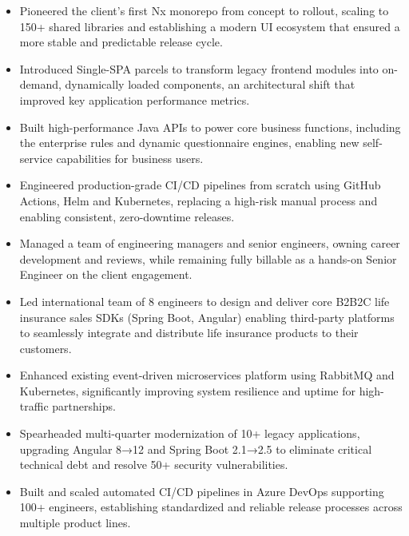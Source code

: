 \begin{itemize}
    \item Pioneered the client's first Nx monorepo from concept to rollout, scaling to 150+ shared libraries and establishing a modern UI ecosystem that ensured a more stable and predictable release cycle.
    \item Introduced Single-SPA parcels to transform legacy frontend modules into on-demand, dynamically loaded components, an architectural shift that improved key application performance metrics.
    \item Built high-performance Java APIs to power core business functions, including the enterprise rules and dynamic questionnaire engines, enabling new self-service capabilities for business users.
    \item Engineered production-grade CI/CD pipelines from scratch using GitHub Actions, Helm and Kubernetes, replacing a high-risk manual process and enabling consistent, zero-downtime releases.
    \item Managed a team of engineering managers and senior engineers, owning career development and reviews, while remaining fully billable as a hands-on Senior Engineer on the client engagement.
\end{itemize}
\vspace{\spacingBetweenJobs}

\begin{itemize}
    \item Led international team of 8 engineers to design and deliver core B2B2C life insurance sales SDKs (Spring Boot, Angular) enabling third-party platforms to seamlessly integrate and distribute life insurance products to their customers.
    \item Enhanced existing event-driven microservices platform using RabbitMQ and Kubernetes, significantly improving system resilience and uptime for high-traffic partnerships.
    \item Spearheaded multi-quarter modernization of 10+ legacy applications, upgrading Angular 8→12 and Spring Boot 2.1→2.5 to eliminate critical technical debt and resolve 50+ security vulnerabilities.
    \item Built and scaled automated CI/CD pipelines in Azure DevOps supporting 100+ engineers, establishing standardized and reliable release processes across multiple product lines.
\end{itemize}
\vspace{\spacingBetweenJobs}

